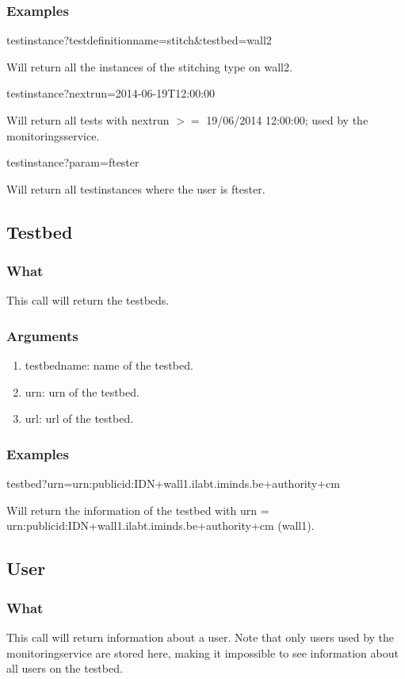 \begin{otherlanguage}{english}
\subsubsection{Examples}
\begin{lt}
testinstance?testdefinitionname=stitch&testbed=wall2
\end{lt}
Will return all the instances of the stitching type on wall2.
\begin{lt}
testinstance?nextrun=2014-06-19T12:00:00
\end{lt}
Will return all tests with nextrun $>=$ 19/06/2014 12:00:00; used by the monitoringsservice.\\
\begin{lt}
testinstance?param=ftester
\end{lt}
Will return all testinstances where the user is ftester.

\subsection{Testbed}
\subsubsection{What}
This call will return the testbeds.
\subsubsection{Arguments}
\begin{enumerate}
\item testbedname: name of the testbed.
\item urn: urn of the testbed.
\item url: url of the testbed.
\end{enumerate}
\subsubsection{Examples}
\begin{lt}
testbed?urn=urn:publicid:IDN+wall1.ilabt.iminds.be+authority+cm
\end{lt}
Will return the information of the testbed with urn = \\
urn:publicid:IDN+wall1.ilabt.iminds.be+authority+cm (wall1).
\\
\subsection{User}
\subsubsection{What}
This call will return information about a user. Note that only users used by the monitoringservice are stored here, making it impossible to see information about all users on the testbed.

\end{otherlanguage}
